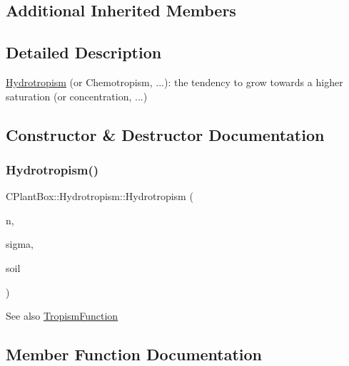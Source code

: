 \subsection*{Additional Inherited Members}


\subsection{Detailed Description}
\hyperlink{classCPlantBox_1_1Hydrotropism}{Hydrotropism} (or Chemotropism, ...)\+: the tendency to grow towards a higher saturation (or concentration, ...) 

\subsection{Constructor \& Destructor Documentation}
\mbox{\label{classCPlantBox_1_1Hydrotropism_a7ffb4286e84c0d1b06374b43ceb29848}} 
\subsubsection{\texorpdfstring{Hydrotropism()}{Hydrotropism()}}
{\footnotesize\ttfamily C\+Plant\+Box\+::\+Hydrotropism\+::\+Hydrotropism (\begin{DoxyParamCaption}\item[{double}]{n,  }\item[{double}]{sigma,  }\item[{\hyperlink{classCPlantBox_1_1SoilLookUp}{Soil\+Look\+Up} $\ast$}]{soil }\end{DoxyParamCaption})\hspace{0.3cm}{\ttfamily [inline]}}

\begin{DoxySeeAlso}{See also}
\hyperlink{classCPlantBox_1_1TropismFunction}{Tropism\+Function} 
\end{DoxySeeAlso}


\subsection{Member Function Documentation}
\mbox{\label{classCPlantBox_1_1Hydrotropism_a5f259c82922f6d62df17f07827db0338}} 

